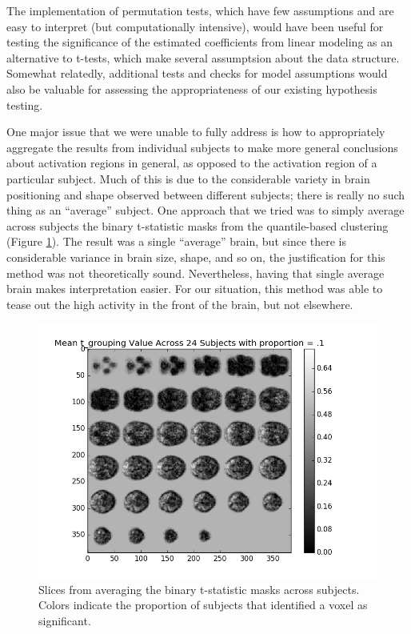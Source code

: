 \par \indent The implementation of permutation tests, which have few 
assumptions and are easy to interpret (but computationally intensive), 
would have been useful for testing the significance of the estimated 
coefficients from linear modeling as an alternative to t-tests, which make 
several assumptsion about the data structure. Somewhat relatedly, 
additional tests and checks for model assumptions would also be valuable 
for assessing the appropriateness of our existing hypothesis testing. 

\par One major issue that we were unable to fully address is how to 
appropriately aggregate the results from individual subjects to make more 
general conclusions about activation regions in general, as opposed to the 
activation region of a particular subject. Much of this is due to the 
considerable variety in brain positioning and shape observed between different 
subjects; there is really no such thing as an ``average'' subject. One 
approach that we tried was to simply average across subjects the binary 
t-statistic masks from the quantile-based clustering (Figure \ref{fig:avgt}). 
The result was a single ``average'' brain, but since there is considerable 
variance in brain size, shape, and so on, the justification for this method 
was not theoretically sound. Nevertheless, having that single average brain 
makes interpretation easier. For our situation, this method was able to tease 
out the high activity in the front of the brain, but not elsewhere. 

\begin{figure}[ht]
\centering
	\includegraphics[width=.8\linewidth]{../images/tgroup_mean_final.png} 
	\caption{Slices from averaging the binary t-statistic masks across 
subjects. Colors indicate the proportion of subjects that identified a voxel 
as significant.}
	\label{fig:avgt}
\end{figure}

